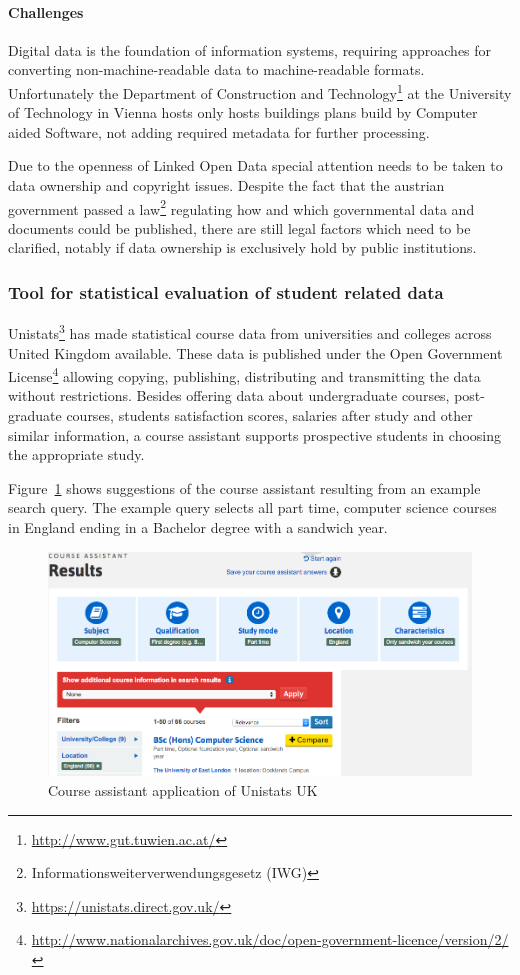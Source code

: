 \documentclass{article}
\begin{document}
\paragraph{Challenges}
Digital data is the foundation of information systems, requiring approaches for converting non-machine-readable data to machine-readable formats. Unfortunately the Department of Construction and Technology\footnote{\url{http://www.gut.tuwien.ac.at/}} at the University of Technology in Vienna hosts only hosts buildings plans build by Computer aided Software, not adding required metadata for further processing. 

Due to the openness of Linked Open Data special attention needs to be taken to data ownership and copyright issues. Despite the fact that the austrian government passed a law\footnote{Informationsweiterverwendungsgesetz (IWG)} regulating how and which governmental data and documents could be published, there are still legal factors which need to be clarified, notably if data ownership is exclusively hold by public institutions. 
\subsubsection{Tool for statistical evaluation of student related data}
Unistats\footnote{\url{https://unistats.direct.gov.uk/}} has made statistical course data from universities and colleges across United Kingdom available. These data is published under the Open Government License\footnote{\url{http://www.nationalarchives.gov.uk/doc/open-government-licence/version/2/}} allowing copying, publishing, distributing and transmitting the data without restrictions. Besides offering data about undergraduate courses, post-graduate courses, students satisfaction scores, salaries after study and other similar information, a course assistant supports prospective students in choosing the appropriate study. 

Figure~\ref{fig:unistats-uk} shows suggestions of the course assistant resulting from an example search query. The example query selects all part time, computer science courses in England  ending in a Bachelor degree with a sandwich year. 
\begin{figure}[H]
	\centering \includegraphics*[width=.8\columnwidth]{unistats_uk.png}
	\caption{Course assistant application of Unistats UK}
	\label{fig:unistats-uk}
\end{figure}
\end{document}
